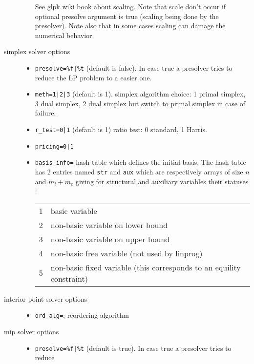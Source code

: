 \begin{mandescription}
\begin{description}
\begin{itemize}
\begin{tabular}{|c|l|}
      \end{tabular}
      See \href{http://en.wikibooks.org/wiki/GLPK/Scaling}{glpk wiki book about scaling}.
      Note that scale   don't occur if optional presolve argument is true (scaling being done by the presolver). 
      Note also that in \href{http://en.wikibooks.org/wiki/GLPK/Modeling_tips#Close-to-zero_values}{some cases} 
      scaling can damage the numerical behavior.
\end{itemize}
\item[simplex solver options]
\begin{itemize}
\item \verb+presolve=%f|%t+ (default is false). In case true a presolver tries to reduce
      the LP problem to a easier one.
\item \verb+meth=1|2|3+ (default is 1). simplex algorithm choice: 1 primal simplex, 3 dual simplex, 2 
      dual simplex but switch to primal simplex in case of failure.
\item \verb+r_test=0|1+ (default is 1) ratio test: 0 standard, 1 Harris.
\item \verb+pricing=0|1+
\item \verb+basis_info=+  hash table which defines the initial basis. The hash table has 2 entries named
      \verb+str+ and \verb+aux+ which are respectively arrays of size $n$ and $m_i+m_e$ giving for
      structural and auxiliary variables their statuses :
      \begin{tabular}{|c|l|}
        \hline
        1 & basic variable \\
        2 & non-basic variable on lower bound \\
        3 & non-basic variable on upper bound\\
        4 & non-basic free variable (not used by linprog) \\
        5 & non-basic fixed variable (this corresponds to an equility constraint)\\
       \hline
      \end{tabular}
\end{itemize}
\item[interior point solver options]
\begin{itemize}
\item \verb+ord_alg=+; reordering algorithm
\end{itemize}
\item[mip solver options]
\begin{itemize}
\item \verb+presolve=%f|%t+ (default is true). In case true a presolver tries to reduce

\end{itemize}
\end{description}
\end{mandescription}
